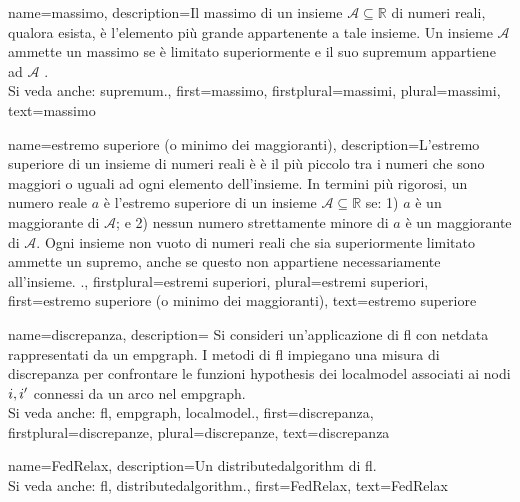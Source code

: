 {name=massimo,
     description={Il massimo di un insieme $\mathcal{A} \subseteq \mathbb{R}$ 
     	di numeri reali, qualora esista, è l’elemento più grande appartenente a tale insieme. Un insieme $\mathcal{A}$ 
     	ammette un massimo se è limitato superiormente e il suo \gls{supremum} appartiene ad $\mathcal{A}$ \cite[Sec.~1.4]{RudinBookPrinciplesMatheAnalysis}.
	\\ 
	Si veda anche: \gls{supremum}.},
 first={massimo},
 firstplural={massimi},
 plural={massimi},
 text={massimo}
}

{name=estremo superiore (o minimo dei maggioranti),
	description={L'estremo superiore di un insieme di numeri reali è 
		è il più piccolo tra i numeri che sono maggiori o uguali ad ogni elemento dell'insieme. In termini più rigorosi, un 
		numero reale $a$ è l'estremo superiore di un insieme $\mathcal{A} \subseteq \mathbb{R}$ se: 1) $a$ 
		è un maggiorante di $\mathcal{A}$; e 2) nessun numero strettamente minore di $a$ è un maggiorante di $\mathcal{A}$. 
		Ogni insieme non vuoto di numeri reali che sia superiormente limitato ammette un supremo, 
		anche se questo non appartiene necessariamente all’insieme. \cite[Sec.~1.4]{RudinBookPrinciplesMatheAnalysis}.},
	firstplural={estremi superiori},
	plural={estremi superiori},
	first={estremo superiore (o minimo dei maggioranti)},
	text={estremo superiore}
}

{name=discrepanza,
	description={
		Si consideri un'applicazione di \gls{fl} con \gls{netdata} 
		rappresentati da un \gls{empgraph}. I metodi di \gls{fl} impiegano una misura di discrepanza per  
		confrontare le funzioni \gls{hypothesis} dei \gls{localmodel} associati ai nodi $i,i'$ 
		connessi da un arco nel \gls{empgraph}.	
				\\ 
		Si veda anche: \gls{fl}, \gls{empgraph}, \gls{localmodel}.},
	first={discrepanza},
	firstplural={discrepanze}, 
  	plural={discrepanze}, 
	text={discrepanza}
}

{name={FedRelax},
	description={Un \gls{distributedalgorithm} di \gls{fl}. 
		\\ 
		Si veda anche: \gls{fl}, \gls{distributedalgorithm}.},
	first={FedRelax},
	text={FedRelax}
} 

